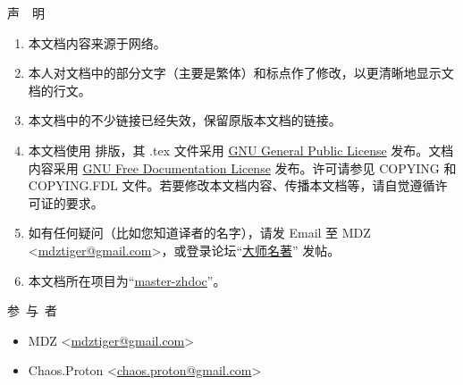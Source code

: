 \centerline{\LARGE 声\,\,\,\,\,\,明}

\baselineskip

\large
\begin{enumerate}
\item 本文档内容来源于网络。
\item 本人对文档中的部分文字（主要是繁体）和标点作了修改，以更清晰地显示文档的行文。
\item 本文档中的不少链接已经失效，保留原版本文档的链接。
\item 本文档使用 \XeLaTeX{} 排版，其 .tex 文件采用 \href{http://www.gnu.org/copyleft/gpl.html}{GNU General Public License} 发布。文档内容采用 \href{http://www.gnu.org/copyleft/fdl.html}{GNU Free Documentation License} 发布。许可请参见 COPYING 和 COPYING.FDL 文件。若要修改本文档内容、传播本文档等，请自觉遵循许可证的要求。
\item 如有任何疑问（比如您知道译者的名字），请发 Email 至 MDZ <\href{mailto:mdztiger@gmail.com}{mdztiger@gmail.com}>，或登录论坛“\href{http://groups.google.com/group/master-zhdoc?hl=zh-CN}{大师名著}” 发帖。
\item 本文档所在项目为“\href{http://code.google.com/p/master-zhdoc/}{master-zhdoc}”。
\end{enumerate}

\normalsize

\baselineskip

\centerline{\LARGE 参\,\,\,与\,\,\,者}

\large
\begin{itemize}
\item MDZ <\href{mailto:mdztiger@gmail.com}{mdztiger@gmail.com}>
\item Chaos.Proton <\href{mailto:chaos.proton@gmail.com}{chaos.proton@gmail.com}>
\end{itemize}


\normalsize 
